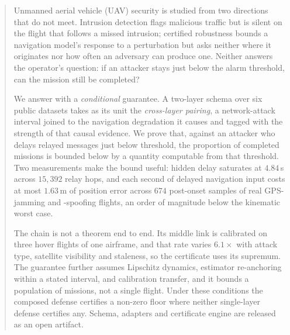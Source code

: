 %
%
%

\begin{abstract}
Unmanned aerial vehicle (UAV) security is studied from two directions that do
not meet. Intrusion detection flags malicious traffic but is silent on the
flight that follows a missed intrusion; certified robustness bounds a navigation
model's response to a perturbation but asks neither where it originates nor how
often an adversary can produce one. Neither answers the operator's question: if
an attacker stays just below the alarm threshold, can the mission still be
completed?

We answer with a \emph{conditional} guarantee. A two-layer schema over six
public datasets takes as its unit the \emph{cross-layer pairing}, a
network-attack interval joined to the navigation degradation it causes and
tagged with the strength of that causal evidence. We prove that, against an
attacker who delays relayed messages just below threshold, the proportion of
completed missions is bounded below by a quantity computable from that
threshold. Two measurements make the bound useful: hidden delay saturates at
$4.84$\,s across $15{,}392$ relay hops, and each second of delayed navigation
input costs at most $1.63$\,m of position error across $674$ post-onset samples
of real GPS-jamming and -spoofing flights, an order of magnitude below the
kinematic worst case.

The chain is not a theorem end to end. Its middle link is calibrated on three
hover flights of one airframe, and that rate varies $6.1\times$ with attack
type, satellite visibility and staleness, so the certificate uses its supremum.
The guarantee further assumes Lipschitz dynamics, estimator re-anchoring within
a stated interval, and calibration transfer, and it bounds a population of
missions, not a single flight. Under these conditions the composed defense
certifies a non-zero floor where neither single-layer defense certifies any.
Schema, adapters and certificate engine are released as an open artifact.
\end{abstract}

